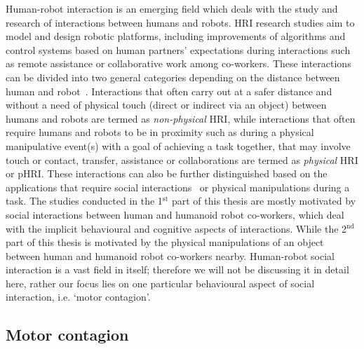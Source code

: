 Human-robot interaction is an emerging field which deals with the study and research of interactions between humans and robots. HRI research studies aim to model and design robotic platforms, including improvements of algorithms and control systems based on human partners' expectations during interactions such as remote assistance or collaborative work among co-workers. These interactions can be divided into two general categories depending on the distance between human and robot~\cite{goodrich2008human}. Interactions that often carry out at a safer distance and without a need of physical touch (direct or indirect via an object) between humans and robots are termed as \textit{non-physical} HRI, while interactions that often require humans and robots to be in proximity such as during a physical manipulative event(s) with a goal of achieving a task together, that may involve touch or contact, transfer, assistance or collaborations are termed as \textit{physical} HRI or pHRI. These interactions can also be further distinguished based on the applications that require social interactions~\cite{tzafestas2016human, Chaminade:JPP:2009} or physical manipulations during a task. The studies conducted in the 1$^\text{st}$ part of this thesis are mostly motivated by social interactions between human and humanoid robot co-workers, which deal with the implicit behavioural and cognitive aspects of interactions. While the 2$^\text{nd}$ part of this thesis is motivated by the physical manipulations of an object between human and humanoid robot co-workers nearby. Human-robot social interaction is a vast field in itself; therefore we will not be discussing it in detail here, rather our focus lies on one particular behavioural aspect of social interaction, i.e. `motor contagion'.




\subsection{Motor contagion}\label{motor contagions}

